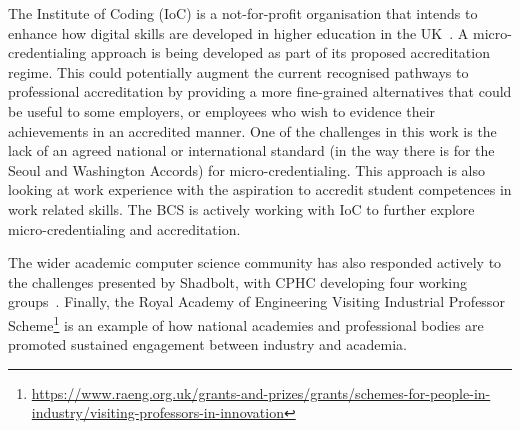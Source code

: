 \documentclass[sigconf]{acmart}
\begin{document}



The Institute of Coding (IoC) is a not-for-profit organisation that
intends to enhance how digital skills are developed in higher
education in the UK~\cite{Davenportetal2019a}. A micro-credentialing
approach is being developed as part of its proposed accreditation
regime. This could potentially augment the current recognised pathways
to professional accreditation by providing a more fine-grained
alternatives that could be useful to some employers, or employees who
wish to evidence their achievements in an accredited manner.  One of
the challenges in this work is the lack of an agreed national or
international standard (in the way there is for the Seoul and
Washington Accords) for micro-credentialing. This approach is also
looking at work experience with the aspiration to accredit student
competences in work related skills. The BCS is actively working with
IoC to further explore micro-credentialing and accreditation.

The wider academic computer science community has also responded
actively to the challenges presented by Shadbolt, with CPHC developing
four working groups~\cite{cphc_2016}.  Finally, the Royal Academy of
Engineering Visiting Industrial Professor Scheme\footnote{\url{https://www.raeng.org.uk/grants-and-prizes/grants/schemes-for-people-in-industry/visiting-professors-in-innovation}} is an
example of how national academies and professional bodies are promoted
sustained engagement between industry and academia.
\end{document}
